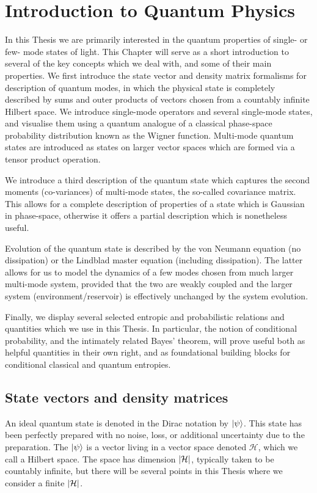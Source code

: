 \section{Introduction to Quantum Physics}

In this Thesis we are primarily interested in the quantum properties of single- or few- mode states of light. This Chapter will serve as a short introduction to several of the key concepts which we deal with, and some of their main properties. We first introduce the state vector and density matrix formalisms for description of quantum modes, in which the physical state is completely described by sums and outer products of vectors chosen from a countably infinite Hilbert space. We introduce single-mode operators and several single-mode states, and visualise them using a quantum analogue of a classical phase-space probability distribution known as the Wigner function. Multi-mode quantum states are introduced as states on larger vector spaces which are formed via a tensor product operation.

We introduce a third description of the quantum state which captures the second moments (co-variances) of multi-mode states, the so-called covariance matrix. This allows for a complete description of properties of a state which is Gaussian in phase-space, otherwise it offers a partial description which is nonetheless useful. 

Evolution of the quantum state is described by the von Neumann equation (no dissipation) or the Lindblad master equation (including dissipation). The latter allows for us to model the dynamics of a few modes chosen from much larger multi-mode system, provided that the two are weakly coupled and the larger system (environment/reservoir) is effectively unchanged by the system evolution. 

Finally, we display several selected entropic and probabilistic relations and quantities which we use in this Thesis. In particular, the notion of conditional probability, and the intimately related Bayes' theorem, will prove useful both as helpful quantities in their own right, and as foundational building blocks for conditional classical and quantum entropies. 





\FloatBarrier
\subsection{State vectors and density matrices}\label{sec:intro_state_vectors}
An ideal quantum state is denoted in the Dirac notation by $\ket{\psi}$. This state has been perfectly prepared with no noise, loss, or additional uncertainty due to the preparation. The $\ket{\psi}$ is a vector living in a vector space denoted $\mathcal{H}$, which we call a Hilbert space. The space has dimension $\left|\mathcal{H}\right|$, typically taken to be countably infinite, but there will be several points in this Thesis where we consider a finite $\left|\mathcal{H}\right|$.

